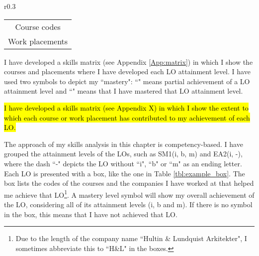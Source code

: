 \begin{wraptable}[5]{r}{0.3\textwidth}
	\centering
	\caption{Example box}
	\label{tbl:example_box}
	\begin{tabular}{|c|}
			\hline
			\rowcolor[HTML]{F8A102} 
			\multicolumn{1}{|c|}{\cellcolor[HTML]{F8A102}\textbf{LO(i, b, m) \nomaster / \master}} \\ \hline
			Course codes \\
			Work placements \\ \hline
	\end{tabular}
\end{wraptable}


I have developed a skills matrix (see Appendix \ref{App:matrix}) in which I show the courses and placements where I have developed each LO attainment level.
I have used two symbols to depict my ``mastery":
``\nomaster" means partial achievement of a LO attainment level and 
``\master" means that I have mastered that LO attainment level.

\hl{I have developed a skills matrix (see Appendix X) in which I show the extent to which each course or work placement has contributed to my achievement of each LO.}
\littlemaster \space \nomaster \space \master

The approach of my skills analysis in this chapter is competency-based.
I have grouped the attainment levels of the LOs, such as SM1(i, b, m) and EA2(i, -), where the dash ``-" depicts the LO without ``i", ``b" or ``m" as an ending letter.
Each LO is presented with a box, like the one in Table \ref{tbl:example_box}.
The box lists the codes of the courses and the companies I have worked at that helped me achieve that LO\footnote{
Due to the length of the company name ``Hultin \& Lundquist Arkitekter", I sometimes abbreviate this to ``H\&L" in the boxes.}.
A mastery level symbol will show my overall achievement of the LO, considering all of its attainment levels (i, b and m).
If there is no symbol in the box, this means that I have not achieved that LO.

